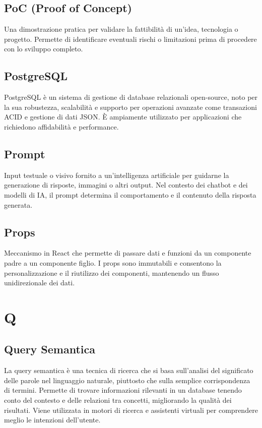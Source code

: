 \documentclass{article}
\begin{document}
\subsection{PoC (Proof of Concept)}
Una dimostrazione pratica per validare la fattibilità di un'idea, tecnologia o progetto. Permette di identificare eventuali rischi o limitazioni prima di procedere con lo sviluppo completo.

\subsection{PostgreSQL}
PostgreSQL è un sistema di gestione di database relazionali open-source, noto per la sua robustezza, scalabilità e supporto per operazioni avanzate come transazioni ACID e gestione di dati JSON. È ampiamente utilizzato per applicazioni che richiedono affidabilità e performance.

\subsection{Prompt}
Input testuale o visivo fornito a un'intelligenza artificiale per guidarne la generazione di risposte, immagini o altri output. Nel contesto dei chatbot e dei modelli di IA, il prompt determina il comportamento e il contenuto della risposta generata.

\subsection{Props}
Meccanismo in React che permette di passare dati e funzioni da un componente padre a un componente figlio. I props sono immutabili e consentono la personalizzazione e il riutilizzo dei componenti, mantenendo un flusso unidirezionale dei dati.

\newpage
\section{Q}

\subsection{Query Semantica}
La query semantica è una tecnica di ricerca che si basa sull'analisi del significato delle parole nel linguaggio naturale, piuttosto che sulla semplice corrispondenza di termini. Permette di trovare informazioni rilevanti in un database tenendo conto del contesto e delle relazioni tra concetti, migliorando la qualità dei risultati. Viene utilizzata in motori di ricerca e assistenti virtuali per comprendere meglio le intenzioni dell'utente.
\end{document}
